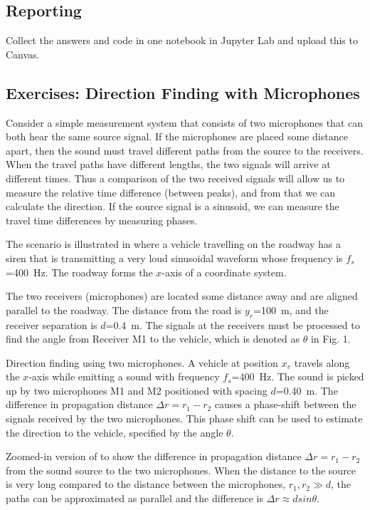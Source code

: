 \subsection*{Reporting}	
Collect the answers and code in one notebook in Jupyter Lab and upload this to Canvas.

\subsection{Exercises: Direction Finding with Microphones}
Consider a simple measurement system that consists of two microphones that can both hear the same source signal. If the microphones are placed some distance apart, then the sound must travel different paths from the source to the receivers. When the travel paths have different lengths, the two signals will arrive at different times. Thus a comparison of the two received signals will allow us to measure the relative time difference (between peaks), and from that we can calculate the direction. If the source signal is a sinusoid, we can measure the travel time differences by measuring phases.

The scenario is illustrated in  where a vehicle travelling on the roadway has a siren that is transmitting a very loud sinusoidal waveform whose frequency is $f_s$=\qty{400}{Hz}. The roadway forms the $x$-axis of a coordinate system.

The two receivers (microphones) are located some distance away and are aligned parallel to the roadway. The distance from the road is $y_r$=\qty{100}{m}, and the receiver separation is $d$=\qty{0.4}{m}. The signals at the receivers must be processed to find the angle from Receiver M1 to the vehicle, which is denoted as $\theta$ in Fig. 1.

\begin{stdfig}
	
	\caption{Direction finding using two microphones. A vehicle at position $x_v$ travels along the $x$-axis while emitting a sound with frequency $f_s$=\qty{400}{Hz}. The sound is picked up by two microphones M1 and M2 positioned with spacing $d$=\qty{0.40}{m}. The difference in propagation distance $\Delta r=r_1-r_2$ causes a phase-shift between the signals received by the two microphones. This phase shift can be used to estimate the direction to the vehicle, specified by the angle $\theta$. }
	\label{fig:overview}
\end{stdfig}

\begin{stdfig}
	
	\caption{Zoomed-in version of  to show the difference in propagation distance $\Delta r=r_1-r_2$ from the sound source to the two  microphones. When the distance to the source is very long compared to the distance between the microphones, $r_1, r_2 \gg d$, the paths can be approximated as parallel and the difference is 
		$\Delta r\approx d sin \theta$. }
	\label{fig:far_field_zoom}
\end{stdfig}


